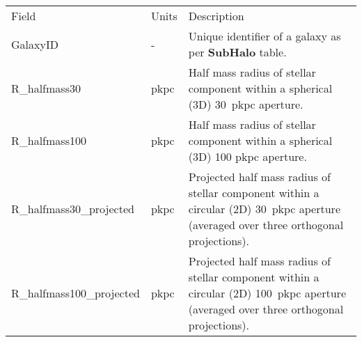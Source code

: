 \begin{table*}
\caption{Full listing of the content of the galaxy sizes table and description of
  the columns. These properties are contained in tables denoted {\bf
    [modelname]\_Sizes}. This table contains half-mass sizes of
    the {\em stellar} component of galaxies using spherical apertures (Furlong et al. (\textit{in prep.}). The \GalaxyID column can be
    used to join this table to the corresponding {\bf
    [modelname]\_SubHalo} table. Only galaxies with total stellar mass $M_*>10^8\Msol$
    have entries in this table. }
\label{table:sizes}
\begin{center}
\footnotesize
\renewcommand{\arraystretch}{1.5}
\begin{tabular}{ >{\ttfamily}p{4cm}p{1.5cm}p{11cm}}
{\large \bf Sizes} & & \\
\hline
\normalfont Field & Units & Description \\
\hline\hline

GalaxyID &
- &
Unique identifier of a galaxy as per {\bf SubHalo} table. \\

\hline

R\_halfmass30 &
pkpc &
Half mass radius of stellar component within a spherical (3D) 30~pkpc aperture.\\

R\_halfmass100 &
pkpc &
Half mass radius of stellar component within a spherical (3D) 100 pkpc aperture.\\

R\_halfmass30\_projected &
pkpc &
Projected half mass radius of stellar component within a circular (2D) 30~pkpc aperture
(averaged over three orthogonal projections).\\

R\_halfmass100\_projected & pkpc & Projected half mass radius of stellar component within a circular
(2D) 100~pkpc aperture (averaged over three orthogonal
projections).\\
\hline

\end{tabular}
\end{center}
\end{table*}






